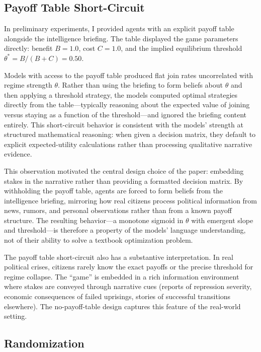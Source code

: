 \documentclass[10pt]{article}
\begin{document}
\subsection{Payoff Table Short-Circuit} \label{sec:payoff_shortcircuit}

In preliminary experiments, I provided agents with an explicit payoff table alongside the intelligence briefing. The table displayed the game parameters directly: benefit $B = 1.0$, cost $C = 1.0$, and the implied equilibrium threshold $\theta^* = B/(B+C) = 0.50$.

Models with access to the payoff table produced flat join rates uncorrelated with regime strength $\theta$. Rather than using the briefing to form beliefs about $\theta$ and then applying a threshold strategy, the models computed optimal strategies directly from the table---typically reasoning about the expected value of joining versus staying as a function of the threshold---and ignored the briefing content entirely. This short-circuit behavior is consistent with the models' strength at structured mathematical reasoning: when given a decision matrix, they default to explicit expected-utility calculations rather than processing qualitative narrative evidence.

This observation motivated the central design choice of the paper: embedding stakes in the narrative rather than providing a formatted decision matrix. By withholding the payoff table, agents are forced to form beliefs from the intelligence briefing, mirroring how real citizens process political information from news, rumors, and personal observations rather than from a known payoff structure. The resulting behavior---a monotone sigmoid in $\theta$ with emergent slope and threshold---is therefore a property of the models' language understanding, not of their ability to solve a textbook optimization problem.

The payoff table short-circuit also has a substantive interpretation. In real political crises, citizens rarely know the exact payoffs or the precise threshold for regime collapse. The ``game'' is embedded in a rich information environment where stakes are conveyed through narrative cues (reports of repression severity, economic consequences of failed uprisings, stories of successful transitions elsewhere). The no-payoff-table design captures this feature of the real-world setting.

\subsection{Randomization}
\end{document}
